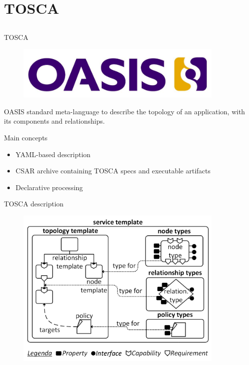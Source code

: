\documentclass{beamer}
\begin{document}
\section{TOSCA}\subsection*{}
  \begin{frame}{TOSCA}
    \begin{figure}
      \includegraphics[width=0.9\textwidth]{img/oasis.png}
    \end{figure}
    OASIS standard meta-language to describe the topology of an application, with its components and relationships.
  \end{frame}

  \begin{frame}{Main concepts}
      \begin{itemize}
        \item YAML-based description
        \item CSAR archive containing TOSCA specs and executable artifacts
        \item Declarative processing
      \end{itemize}
  \end{frame}

  \begin{frame}{TOSCA description}
    \begin{figure}
      \includegraphics[width=0.9\textwidth]{img/service-template.png}
    \end{figure}
  \end{frame}
\end{document}
